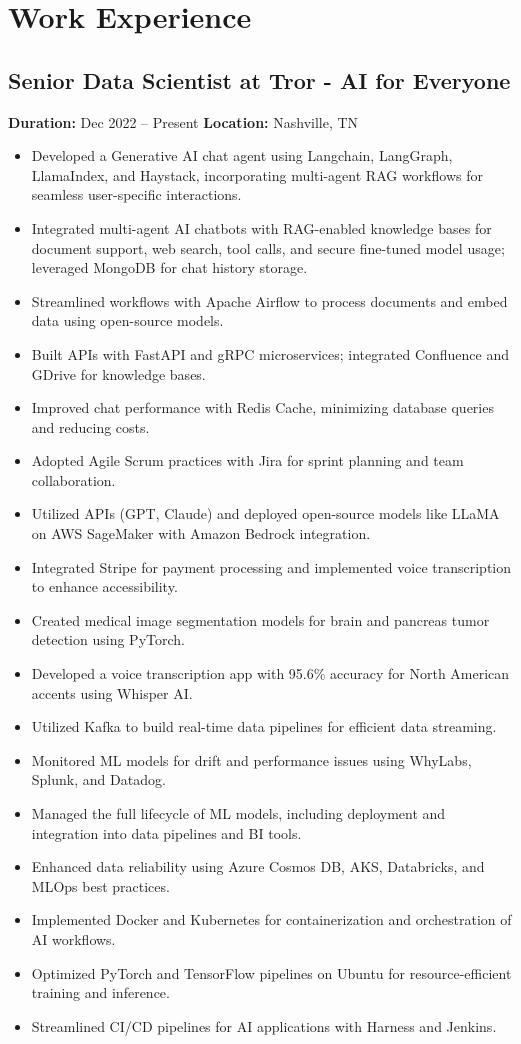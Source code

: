 \documentclass[10pt]{article}
\begin{document}
\section*{Work Experience}
\subsection*{Senior Data Scientist at Tror - AI for Everyone}
\textbf{Duration:} Dec 2022 -- Present\quad
\textbf{Location:} Nashville, TN\\

\begin{itemize}
  \item Developed a Generative AI chat agent using Langchain, LangGraph, LlamaIndex, and Haystack, incorporating multi-agent RAG workflows for seamless user-specific interactions.
  \item Integrated multi-agent AI chatbots with RAG-enabled knowledge bases for document support, web search, tool calls, and secure fine-tuned model usage; leveraged MongoDB for chat history storage.
  \item Streamlined workflows with Apache Airflow to process documents and embed data using open-source models.
  \item Built APIs with FastAPI and gRPC microservices; integrated Confluence and GDrive for knowledge bases.
  \item Improved chat performance with Redis Cache, minimizing database queries and reducing costs.
  \item Adopted Agile Scrum practices with Jira for sprint planning and team collaboration.
  \item Utilized APIs (GPT, Claude) and deployed open-source models like LLaMA on AWS SageMaker with Amazon Bedrock integration.
  \item Integrated Stripe for payment processing and implemented voice transcription to enhance accessibility.
  \item Created medical image segmentation models for brain and pancreas tumor detection using PyTorch.
  \item Developed a voice transcription app with 95.6\% accuracy for North American accents using Whisper AI.
  \item Utilized Kafka to build real-time data pipelines for efficient data streaming.
  \item Monitored ML models for drift and performance issues using WhyLabs, Splunk, and Datadog.
  \item Managed the full lifecycle of ML models, including deployment and integration into data pipelines and BI tools.
  \item Enhanced data reliability using Azure Cosmos DB, AKS, Databricks, and MLOps best practices.
  \item Implemented Docker and Kubernetes for containerization and orchestration of AI workflows.
  \item Optimized PyTorch and TensorFlow pipelines on Ubuntu for resource-efficient training and inference.
  \item Streamlined CI/CD pipelines for AI applications with Harness and Jenkins.
\end{itemize}
\end{document}
